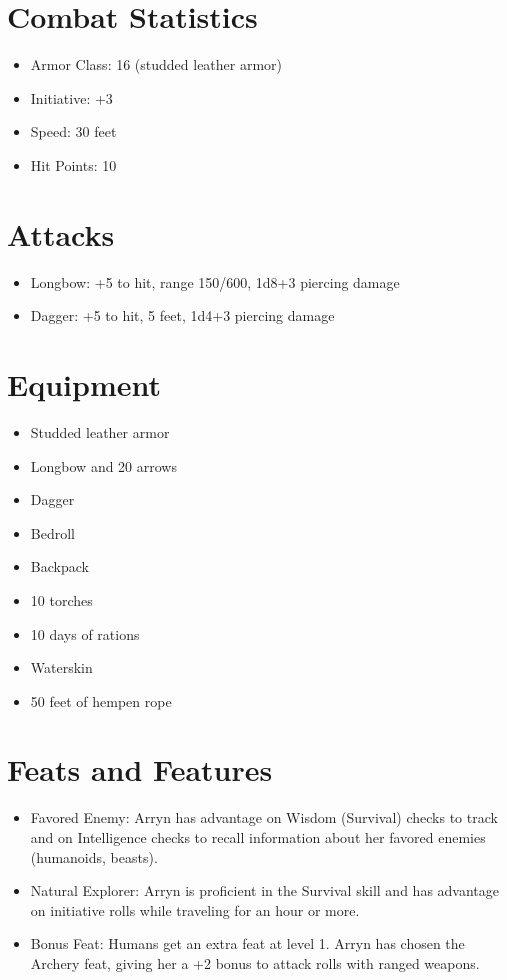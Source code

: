 \documentclass{article}
\begin{document}
\section{Combat Statistics}
\begin{itemize}
\item Armor Class: 16 (studded leather armor)
\item Initiative: +3
\item Speed: 30 feet
\item Hit Points: 10
\end{itemize}

\section{Attacks}
\begin{itemize}
\item Longbow: +5 to hit, range 150/600, 1d8+3 piercing damage
\item Dagger: +5 to hit, 5 feet, 1d4+3 piercing damage
\end{itemize}

\section{Equipment}
\begin{itemize}
\item Studded leather armor
\item Longbow and 20 arrows
\item Dagger
\item Bedroll
\item Backpack
\item 10 torches
\item 10 days of rations
\item Waterskin
\item 50 feet of hempen rope
\end{itemize}

\section{Feats and Features}
\begin{itemize}
\item Favored Enemy: Arryn has advantage on Wisdom (Survival) checks to track and on Intelligence checks to recall information about her favored enemies (humanoids, beasts).
\item Natural Explorer: Arryn is proficient in the Survival skill and has advantage on initiative rolls while traveling for an hour or more.
\item Bonus Feat: Humans get an extra feat at level 1. Arryn has chosen the Archery feat, giving her a +2 bonus to attack rolls with ranged weapons.
\end{itemize}
\end{document}

